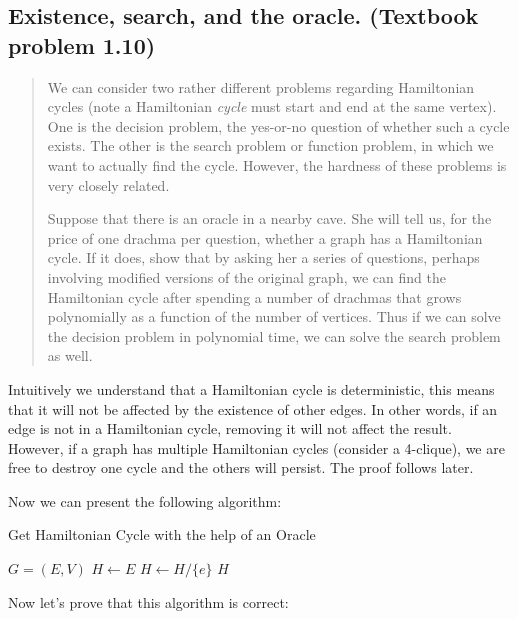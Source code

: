 \subsection*{Existence, search, and the oracle. (Textbook problem 1.10)}
    \begin{quote}
    We can consider two rather different problems regarding Hamiltonian cycles (note a Hamiltonian \emph{cycle} must start and end at the same vertex). One is the decision problem, the yes-or-no question of whether such a cycle exists. The other is the search problem or function problem, in which we want to actually find the cycle. However, the hardness of these problems is very closely related.

    Suppose that there is an oracle in a nearby cave. She will tell us, for the price of one drachma per question, whether a graph has a Hamiltonian cycle. If it does, show that by asking her a series of questions, perhaps involving modified versions of the original graph, we can find the Hamiltonian cycle after spending a number of drachmas that grows polynomially as a function of the number of vertices. Thus if we can solve the decision problem in polynomial time, we can solve the search problem as well.
    \end{quote}

\solution

Intuitively we understand that a Hamiltonian cycle is deterministic, this means that it will not be affected by the existence of other edges.
In other words, if an edge is not in a Hamiltonian cycle, removing it will not affect the result.
However, if a graph has multiple Hamiltonian cycles (consider a 4-clique), we are free to destroy one cycle and the others will persist. 
The proof follows later.

Now we can present the following algorithm:

\begin{algorithm}
\caption{Get Hamiltonian Cycle with the help of an Oracle}
\begin{algorithmic}
	\REQUIRE $G = (E, V)$
	\STATE $H \leftarrow E$
			\STATE $H \leftarrow H / \{e\}$
		\ENDIF
	\ENDFOR
	\RETURN $H$
\end{algorithmic}
\end{algorithm}

Now let's prove that this algorithm is correct:

